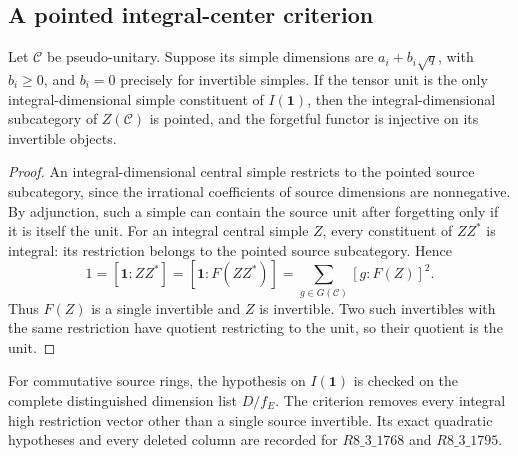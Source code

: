 \subsection{A pointed integral-center criterion}
\begin{proposition}
Let $\mathcal C$ be pseudo-unitary. Suppose its simple dimensions are
$a_i+b_i\sqrt q$, with $b_i\geq0$, and $b_i=0$ precisely for invertible
simples. If the tensor unit is the only integral-dimensional simple
constituent of $I(\mathbf1)$, then the integral-dimensional subcategory
of $Z(\mathcal C)$ is pointed, and the forgetful functor is injective
on its invertible objects.
\end{proposition}
\begin{proof}
An integral-dimensional central simple restricts to the pointed source
subcategory, since the irrational coefficients of source dimensions are
nonnegative. By adjunction, such a simple can contain the source unit
after forgetting only if it is itself the unit. For an integral central
simple $Z$, every constituent of $ZZ^*$ is integral: its restriction
belongs to the pointed source subcategory. Hence
\[
 1=[\mathbf1:ZZ^*]=[\mathbf1:F(ZZ^*)]
   =\sum_{g\in G(\mathcal C)}[g:F(Z)]^2.
\]
Thus $F(Z)$ is a single invertible and $Z$ is invertible. Two such
invertibles with the same restriction have quotient restricting to the
unit, so their quotient is the unit.
\end{proof}
For commutative source rings, the hypothesis on $I(\mathbf1)$ is checked
on the complete distinguished dimension list $D/f_E$. The criterion
removes every integral high restriction vector other than a single
source invertible. Its exact quadratic hypotheses and every deleted
column are recorded for $R8\_3\_1768$ and $R8\_3\_1795$.
